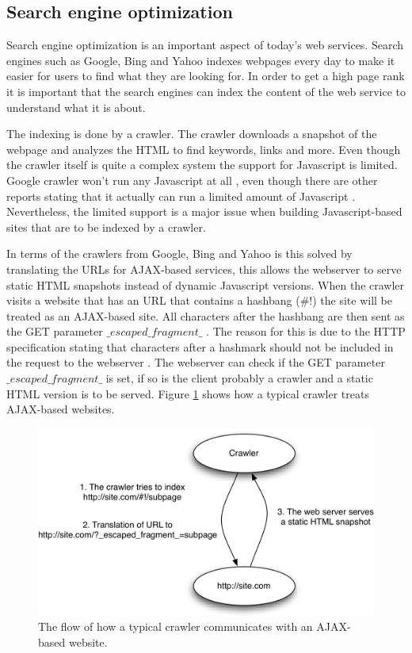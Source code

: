 \subsection{Search engine optimization}

Search engine optimization is an important aspect of today's web services. Search engines such as Google, Bing and Yahoo indexes webpages every day to make it easier for users to find what they are looking for. In order to get a high page rank it is important that the search engines can index the content of the web service to understand what it is about.

The indexing is done by a crawler. The crawler downloads a snapshot of the webpage and analyzes the HTML to find keywords, links and more. Even though the crawler itself is quite a complex system the support for Javascript is limited. Google crawler won't run any Javascript at all \cite{google_crawler_nojs}, even though there are other reports stating that it actually can run a limited amount of Javascript \cite{google_crawler_some_js}. Nevertheless, the limited support is a major issue when building Javascript-based sites that are to be indexed by a crawler.

In terms of the crawlers from Google, Bing and Yahoo is this solved by translating the URLs for AJAX-based services, this allows the webserver to serve static HTML snapshots instead of dynamic Javascript versions. When the crawler visits a website that has an URL that contains a hashbang (\#!) the site will be treated as an AJAX-based site. All characters after the hashbang are then sent as the GET parameter $\_escaped\_fragment\_$ \cite{escaped_fragment}. The reason for this is due to the HTTP specification stating that characters after a hashmark should not be included in the request to the webserver \cite{no_url_sent}. The webserver can check if the GET parameter $\_escaped\_fragment\_$ is set, if so is the client probably a crawler and a static HTML version is to be served. Figure \ref{fig:crawler_flow} shows how a typical crawler treats AJAX-based websites.

\begin{figure}[h!]
	\centerline{\includegraphics[width=120mm]{gfx/seo_flow.png}}
	\caption{The flow of how a typical crawler communicates with an AJAX-based website.}
	\label{fig:crawler_flow}
\end{figure}
